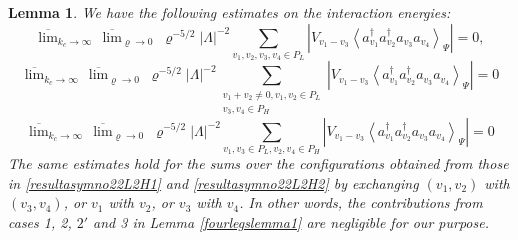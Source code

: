 \documentclass[11pt]{article}
\numberwithin{equation}{section}
\newcommand{\beq}{\begin{equation}}
\newcommand{\eeq}{\end{equation}}
\renewcommand\rho\varrho
\newtheorem{lem}{Lemma}[section]
\theoremstyle{definition}
\begin{document}
\begin{lem}We have the following estimates on the interaction energies: 
\beq\label{resultasymno24L}
\overline\lim_{k_c\to\infty}\,\overline\lim_{\rho\to0}
 \; \rho^{-5/2} {|\Lambda|}^{-2}  \sum_{v_1,v_2,v_3,v_4\in P_L} \left | V_{v_{1}-v_{3}}\left\langle a_{v_1}^\dagger a_{v_2}^\dagger a_{v_3}a_{v_4}\right\rangle_{\Psi}\right| =0,
\eeq
\beq\label{resultasymno22L2H1}
\overline\lim_{k_c\to\infty}\,\overline\lim_{\rho\to0}
\; \rho^{-5/2} {|\Lambda|}^{-2}  \sum_{\substack{v_1+v_2\neq0, v_1,v_2\in P_L\\ v_3,v_4\in P_H}}  \left | V_{v_{1}-v_{3}}\left\langle a_{v_1}^\dagger a_{v_2}^\dagger a_{v_3}a_{v_4}\right\rangle_{\Psi}\right|  = 0
\eeq
\beq\label{resultasymno22L2H2}
\overline\lim_{k_c\to\infty}\,\overline\lim_{\rho\to0}
 \; \rho^{-5/2} {|\Lambda|}^{-2}  \sum_{v_1,v_3\in P_L,v_2,v_4\in P_H} \left | V_{v_{1}-v_{3}}\left\langle a_{v_1}^\dagger a_{v_2}^\dagger a_{v_3}a_{v_4}\right\rangle_{\Psi}\right|  =0
\eeq
The same estimates hold for the sums over the configurations obtained from those in \eqref{resultasymno22L2H1} and \eqref{resultasymno22L2H2} by exchanging $(v_1,v_2)$ with $(v_3,v_4)$, or $v_1$ with $v_2$, or $v_3$ with $v_4$.
In other words, the contributions from cases 1, 2, $2'$ and 3 in Lemma \ref{fourlegslemma1} are negligible for our purpose.
\end{lem}
\end{document}
